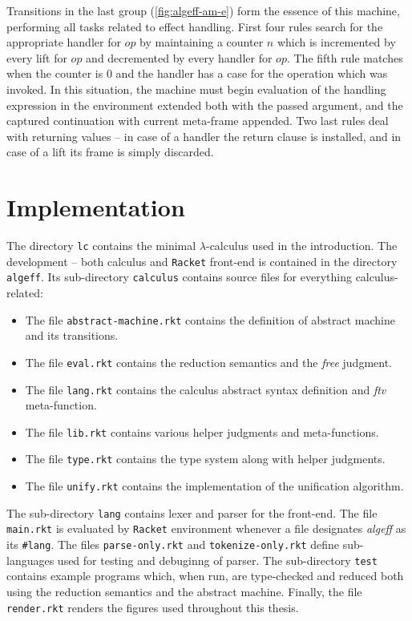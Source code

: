 \documentclass[inz, english, shortabstract]{iithesis}
\newcommand{\Racket}{\texttt{Racket}}
\newcommand{\LC}{\(\lambda\)-calculus}
\begin{document}
Transitions in the last group (\autoref{fig:algeff-am-e}) form the essence of this machine, performing all tasks related to effect handling.
First four rules search for the appropriate handler for $ op $ by maintaining a counter $ n $ which is incremented by every lift for $ op $ and decremented by every handler for $ op $.
The fifth rule matches when the counter is $ 0 $ and the handler has a case for the operation which was invoked. 
In this situation, the machine must begin evaluation of the handling expression in the environment extended both with the passed argument, and the captured continuation with current meta-frame appended.
Two last rules deal with returning values -- in case of a handler the return clause is installed, and in case of a lift its frame is simply discarded.

\chapter{Implementation}\label{ch:implementation}
The directory \texttt{lc} contains the minimal \LC{} used in the introduction.
The development -- both calculus and \Racket{} front-end is contained in the directory \texttt{algeff}.
Its sub-directory \texttt{calculus} contains source files for everything calculus-related:
\begin{itemize}
  \item The file \texttt{abstract-machine.rkt} contains the definition of abstract machine and its transitions.
  \item The file \texttt{eval.rkt} contains the reduction semantics and the \emph{free} judgment.
  \item The file \texttt{lang.rkt} contains the calculus abstract syntax definition and \emph{ftv} meta-function.
  \item The file \texttt{lib.rkt} contains various helper judgments and meta-functions.
  \item The file \texttt{type.rkt} contains the type system along with helper judgments.
  \item The file \texttt{unify.rkt} contains the implementation of the unification algorithm.
\end{itemize}
The sub-directory \texttt{lang} contains lexer and parser for the front-end.
The file \texttt{main.rkt} is evaluated by \Racket{} environment whenever a file designates \emph{algeff} as its \texttt{\#lang}.
The files \texttt{parse-only.rkt} and \texttt{tokenize-only.rkt} define sub-languages used for testing and debuginng of parser.
The sub-directory \texttt{test} contains example programs which, when run, are type-checked and reduced both using the reduction semantics and the abstract machine.
Finally, the file \texttt{render.rkt} renders the figures used throughout this thesis.
\end{document}
